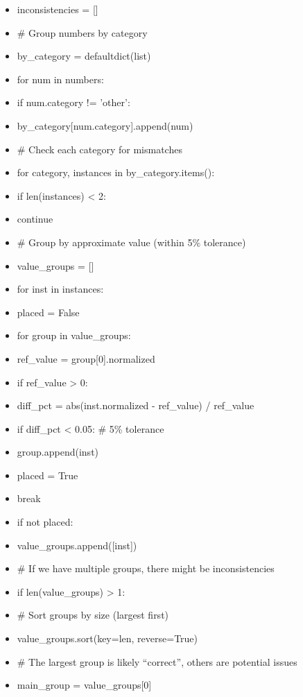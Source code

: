 \documentclass[11pt]{article}
\begin{document}
\begin{itemize}[leftmargin=*,itemsep=2pt,topsep=2pt]
\item {} inconsistencies = []
\item {} \# Group numbers by category
\item {} by\_\allowbreak{}category = defaultdict(list)
\item {} for num in numbers:
\item {} if num.category != 'other':
\item {} by\_\allowbreak{}category[num.category].append(num)
\item {} \# Check each category for mismatches
\item {} for category, instances in by\_\allowbreak{}category.items():
\item {} if len(instances) < 2:
\item {} continue
\item {} \# Group by approximate value (within 5\% tolerance)
\item {} value\_\allowbreak{}groups = []
\item {} for inst in instances:
\item {} placed = False
\item {} for group in value\_\allowbreak{}groups:
\item {} ref\_\allowbreak{}value = group[0].normalized
\item {} if ref\_\allowbreak{}value > 0:
\item {} diff\_\allowbreak{}pct = abs(inst.normalized - ref\_\allowbreak{}value) / ref\_\allowbreak{}value
\item {} if diff\_\allowbreak{}pct < 0.05: \# 5\% tolerance
\item {} group.append(inst)
\item {} placed = True
\item {} break
\item {} if not placed:
\item {} value\_\allowbreak{}groups.append([inst])
\item {} \# If we have multiple groups, there might be inconsistencies
\item {} if len(value\_\allowbreak{}groups) > 1:
\item {} \# Sort groups by size (largest first)
\item {} value\_\allowbreak{}groups.sort(key=len, reverse=True)
\item {} \# The largest group is likely ``correct'', others are potential issues
\item {} main\_\allowbreak{}group = value\_\allowbreak{}groups[0]

\end{itemize}
\end{document}
